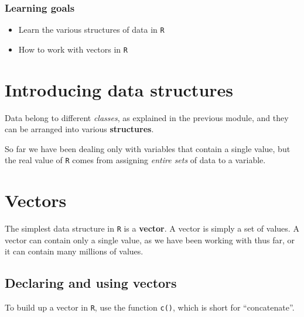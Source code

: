 \documentclass[
]{book}
\providecommand{\tightlist}{%
  \setlength{\itemsep}{0pt}\setlength{\parskip}{0pt}}
\begin{document}
\hypertarget{learning-goals-3}{%
\subsubsection*{Learning goals}\label{learning-goals-3}}

\begin{itemize}
\tightlist
\item
  Learn the various structures of data in \texttt{R}\\
\item
  How to work with vectors in \texttt{R}
\end{itemize}

\hypertarget{introducing-data-structures}{%
\section*{Introducing data structures}\label{introducing-data-structures}}

Data belong to different \emph{classes}, as explained in the previous module, and they can be arranged into various \textbf{structures}.

So far we have been dealing only with variables that contain a single value, but the real value of \texttt{R} comes from assigning \emph{entire sets} of data to a variable.

\hypertarget{vectors}{%
\section*{Vectors}\label{vectors}}

The simplest data structure in \texttt{R} is a \textbf{vector}. A vector is simply a set of values. A vector can contain only a single value, as we have been working with thus far, or it can contain many millions of values.

\hypertarget{declaring-and-using-vectors}{%
\subsection*{Declaring and using vectors}\label{declaring-and-using-vectors}}

To build up a vector in \texttt{R}, use the function \texttt{c()}, which is short for ``concatenate''.
\end{document}

